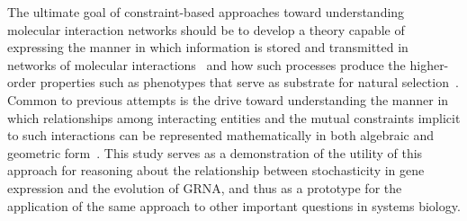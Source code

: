 
The ultimate goal of constraint-based approaches toward understanding molecular interaction networks should be to develop a theory capable of expressing the manner in which information is stored and transmitted in networks of molecular interactions~\cite{Tkacik2011a,Bialek2012} and how such processes produce the higher-order properties such as phenotypes that serve as substrate for natural selection~\cite{Mora2013}.
Common to previous attempts is the drive toward understanding the manner in which relationships among interacting entities and the mutual constraints implicit to such interactions can be represented mathematically in both algebraic and geometric form~\cite{Ay2011,Balduzzi2012}. This study serves as a demonstration of the utility of this approach for reasoning about the relationship between stochasticity in gene expression and the evolution of GRNA, and thus as a prototype for the application of the same approach to other important questions in systems biology.
